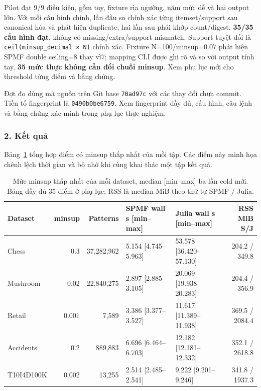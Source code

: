 Pilot đạt 9/9 điều kiện, gồm toy, fixture rìa ngưỡng, năm mức dễ và hai output lớn. Với mỗi cấu hình chính, lần đầu so chính xác từng itemset/support sau canonical hóa và phát hiện duplicate; hai lần sau phải khớp count/digest. \textbf{35/35 cấu hình đạt}, không có missing/extra/support mismatch. Support tuyệt đối là \texttt{ceil(minsup\_decimal\ ×\ N)} chính xác. Fixture N=100/minsup=0.07 phát hiện SPMF double ceiling=8 thay vì7; mapping CLI được ghi rõ và so với output tính tay. \textbf{35 mức thực không cần đổi chuỗi minsup}. Xem phụ lục mới cho threshold từng điểm và bằng chứng.

Đợt đo dùng mã nguồn trên Git base \texttt{70ad97c} với các thay đổi chưa commit. Tiền tố fingerprint là \texttt{0490b0be6759}. Xem fingerprint đầy đủ, cấu hình, câu lệnh và bằng chứng xác minh trong phụ lục thực nghiệm.

\subsubsection{2. Kết quả}

Bảng~\ref{tab:c2-V} tổng hợp điểm có minsup thấp nhất của mỗi tập. Các điểm này minh họa chênh lệch thời gian và bộ nhớ khi cùng khai thác một tập kết quả.

\begin{table}[!t]
\centering\footnotesize
\caption{Mức minsup thấp nhất của mỗi dataset, median {[}min--max{]} ba lần cold
mới. Bảng đầy đủ 35 điểm ở phụ lục; RSS là median MiB theo thứ tự SPMF /
Julia.}
\label{tab:c2-V}
\setlength{\tabcolsep}{4pt}
\begin{tabular}{lrrllr}
\hline
\textbf{Dataset} & \textbf{minsup} & \textbf{Patterns} & \textbf{SPMF wall s {[}min--max{]}} & \textbf{Julia wall s {[}min--max{]}} & \textbf{RSS MiB S/J} \\ \hline
Chess & 0.3 & 37,282,962 & 5.154 {[}4.745--5.963{]} & 53.578 {[}36.420--57.130{]} & 204.2 / 349.8 \\
Mushroom & 0.02 & 22,840,275 & 2.897 {[}2.885--3.105{]} & 20.069 {[}19.938--20.283{]} & 204.4 / 356.9 \\
Retail & 0.001 & 7,589 & 3.386 {[}3.377--3.527{]} & 11.617 {[}11.389--11.938{]} & 369.5 / 2084.4 \\
Accidents & 0.2 & 889,883 & 6.696 {[}6.464--6.703{]} & 12.182 {[}12.181--12.332{]} & 352.1 / 2618.8 \\
T10I4D100K & 0.002 & 13,255 & 2.514 {[}2.485--2.541{]} & 9.222 {[}9.201--9.246{]} & 341.8 / 1937.3 \\
\hline
\end{tabular}
\end{table}

